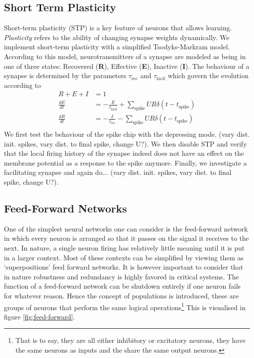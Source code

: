 \documentclass[a4paper,twocolumn]{article}
\begin{document}
\subsection{Short Term Plasticity}
Short-term plasticity (STP) is a key feature of neurons that allows learning. 
\textit{Plasticity} refers to the ability of changing synapse weights dynamically.  
We implement short-term plasticity with a simplified Tsodyks-Markram model.  According 
to this model,  neurotransmitters of a synapse are modeled as being in one of 
three states: Recovered (\textbf{R}),  Effective (\textbf{E}),  Inactive 
(\textbf{I}).  The behaviour of a synapse is determined by the parameters 
$\tau_\text{rec}$ and $\tau_\text{facil}$ which govern the evolution according to 
\begin{align*}
	R + E + I &= 1 \\
	\frac{dE}{dt} &= - \frac{E}{\tau_\text{facil}} + \sum_\text{spike} UR\delta(t-t_\text{spike} ) \\
	\frac{dR}{dt} &= - \frac{I}{\tau_\text{rec}} - \sum_\text{spike} UR\delta(t-t_\text{spike} ) \\
\end{align*}
We first test the behaviour of the spike chip with the depressing mode.  (vary 
dist. init. spikes,  vary dist. to final spike,  change U?).   %
We then disable STP and verify that the local firing history of the synapse 
indeed does not have an effect on the membrane potential as a response to the spike 
anymore.  %
Finally,  we investigate a facilitating synapse and again do... (vary  dist. init. 
spikes,  vary dist. to final spike,  change U?). %


\subsection{Feed-Forward Networks}
\label{sec:feed-forward}

One of the simplest neural networks one can consider is the feed-forward
network in which every neuron is arranged so that it passes on the signal it
receives to the next. In nature, a single neuron firing has relatively little
meaning until it is put in a larger context. Most of these contexts can be
simplified by viewing them as `superpositions' feed forward networks. It is
however important to consider that in nature robustness and redundancy is
highly favored in critical systems. The function of a feed-forward network can
be shutdown entirely if one neuron fails for whatever reason. Hence the concept
of populations is introduced, these are groups of neurons that perform the same
logical operations\footnote{That is to say, they are all either inhibitory or
excitatory neurons, they have the same neurons as inputs and the share the same
output neurons.} This is visualised in figure \ref{fig:feed-forward}.
\end{document}
